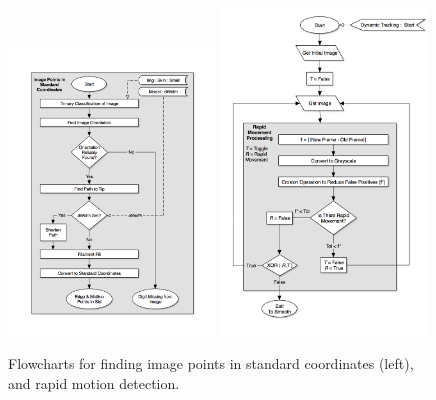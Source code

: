 \begin{figure}[h!]
  \centering
    \includegraphics[width=0.49\textwidth]{Chapter4/Figs/Fingerpress_Std_Coordinates.jpg}
    \includegraphics[width=0.49\textwidth]{Chapter4/Figs/Fingerpress_Rapid_Movement.jpg}
    \caption{Flowcharts for finding image points in standard coordinates (left), and rapid motion detection.}\label{fig:FingerpressStdCoordinates&RapidMovement}
\end{figure}


